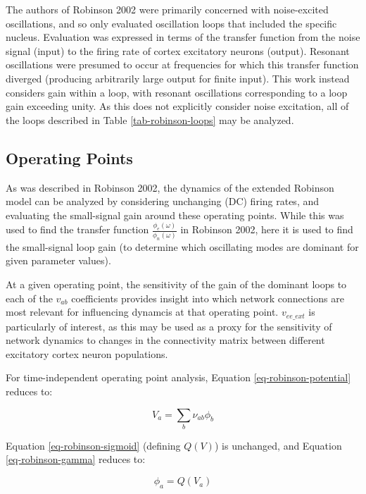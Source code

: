 The authors of Robinson 2002 were primarily concerned with noise-excited
oscillations, and so only evaluated oscillation loops that included the
specific nucleus. Evaluation was expressed in terms of the transfer
function from the noise signal (input) to the firing rate of cortex
excitatory neurons (output). Resonant oscillations were presumed to occur
at frequencies for which this transfer function diverged (producing
arbitrarily large output for finite input). This work instead considers
gain within a loop, with resonant oscillations corresponding to a loop
gain exceeding unity. As this does not explicitly consider noise excitation,
all of the loops described in Table \ref{tab-robinson-loops} may be
analyzed.

\subsection{Operating Points}
\label{sect-robinson-math-fixed}

As was described in Robinson 2002, the dynamics of the extended Robinson
model can be analyzed by considering unchanging (DC) firing rates, and
evaluating the small-signal gain around these operating points. While this
was used to find the transfer function
$\frac{\phi_e(\omega)}{\phi_n(\omega)}$ in Robinson 2002, here it is used
to find the small-signal loop gain (to determine which oscillating modes
are dominant for given parameter values).

At a given operating point, the sensitivity of the gain of the dominant
loops to each of the $v_{ab}$ coefficients provides insight into which
network connections are most relevant for influencing dynamcis at that
operating point. $v_{ee\_ext}$ is particularly of interest, as this
may be used as a proxy for the sensitivity of network dynamics to changes
in the connectivity matrix between different excitatory cortex neuron
populations.

For time-independent operating point analysis, Equation
\ref{eq-robinson-potential} reduces to:

\begin{equation}
V_a = \sum_b \nu_{ab} \phi_b
\label{eq-robinson-dc-potential}
\end{equation}

Equation \ref{eq-robinson-sigmoid} (defining $Q(V)$) is unchanged, and
Equation \ref{eq-robinson-gamma} reduces to:

\begin{equation}
\phi_a = Q(V_a)
\label{eq-robinson-dc-nogamma}
\end{equation}

